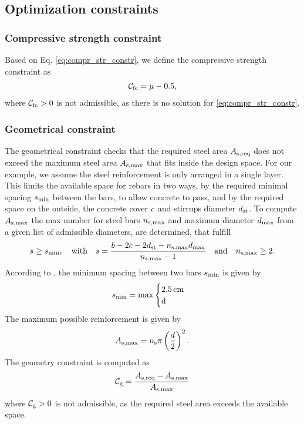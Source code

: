 \subsection{Optimization constraints}
\subsubsection{Compressive strength constraint}
Based on Eq. \ref{eq:compr_str_constr}, we define the compressive strength constraint as
\begin{align}
	\mathcal{C}_{\text{fc}} = \mu - 0.5, \label{eq:constraintfc}
\end{align}
where $\mathcal{C}_{\text{fc}} > 0$ is not admissible, as there is no solution for \ref{eq:compr_str_constr}.
\subsubsection{Geometrical constraint}
The geometrical constraint checks that the required steel area $A_{\text{s,req}}$ does not exceed the maximum steel area $A_{\text{s,max}}$ that fits inside the design space.
For our example, we assume the steel reinforcement is only arranged in a single layer.
This limits the available space for rebars in two ways, by the required minimal spacing $s_{\text{min}}$ between the bars, to allow concrete to pass, and by the required space on the outside, the concrete cover $c$ and stirrups diameter $d_{\text{st}}$.
To compute $A_{\text{s,max}}$ the max number for steel bars $n_{\text{s,max}}$ and maximum diameter $d_{\text{max}}$ from a given list of admissible diameters, are determined, that fulfill
\begin{equation}
	s \ge s_{\text{min}},\quad\text{with}\quad s = \frac{b - 2 c - 2 d_{\text{st}} - n_{\text{s,max}} d_{\text{max}}}{n_{\text{s,max}} - 1} \quad\text{and}\quad n_{\text{s,max}} \ge 2.
\end{equation}
According to \citeauthor{DIN1992-1-1}, the minimum spacing between two bars $s_{\text{min}}$ is given by
\begin{equation}
	\beamMinSpacing = \max
	\begin{cases}
		\inputconcretecover \,\text{\inputconcretecoverunit}\\
		$\beamSteelDiameter$
	\end{cases}       
\end{equation}
The maximum possible reinforcement is given by
\begin{equation}
	A_{\text{s,max}} = n_{\text{s}} \pi \left( \frac{d}{2}\right)^{2}.
\end{equation}
The geometry constraint is computed as
\begin{equation}
	\mathcal{C}_{\text{g}} = \frac{A_{\text{s,req}} - A_{\text{s,max}}}{A_{\text{s,max}}} \label{eq:constraintGeo}
\end{equation}
where $\mathcal{C}_{\text{g}} > 0$ is not admissible, as the required steel area exceeds the available space.
